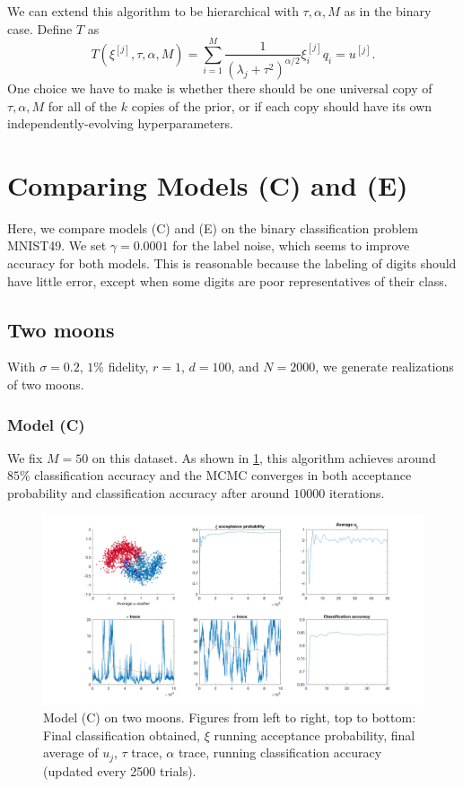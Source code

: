\documentclass{siamart1116}
\begin{document}
        We can extend this algorithm to be hierarchical with $\tau, \alpha, M$ as in the binary case. Define $T$ as
         \[T(\xi^{[j]}, \tau, \alpha, M) = \sum_{i=1}^M \frac{1}{(\lambda_j + \tau^2)^{\alpha/2}} \xi^{[j]}_i q_i = u^{[j]}.\]
         One choice we have to make is whether there should be one universal copy of $\tau, \alpha, M$ for all of the $k$ copies of the prior, or if each copy should have its own independently-evolving hyperparameters.

\section{Comparing Models (C) and (E)}
    Here, we compare models (C) and (E) on the binary classification problem MNIST49. We set $\gamma = 0.0001$ for the label noise, which seems to improve accuracy for both models. This is reasonable because the labeling of digits should have little error, except when some digits are poor representatives of their class.
    
    \iffalse
    \subsection{Two moons}
        With $\sigma=0.2$, $1\%$ fidelity, $r=1$, $d=100$, and $N=2000$, we generate realizations of two moons.
        \subsubsection{Model (C)}
            We fix $M=50$ on this dataset. As shown in \cref{fig:model_c_two_moons}, this algorithm achieves around $85\%$ classification accuracy and the MCMC converges in both acceptance probability and classification accuracy after around $10000$ iterations.
            \begin{figure}[!htb]
                \centering
                \caption{\label{fig:model_c_two_moons}Model (C) on two moons. Figures from left to right, top to bottom: Final classification obtained, $\xi$ running acceptance probability, final average of $u_j$, $\tau$ trace, $\alpha$ trace, running classification accuracy (updated every 2500 trials).}
                \includegraphics[width=0.8\linewidth]{model_c_vs_model_e/moons/learn_t_a/all.png}
            \end{figure}
\end{document}
